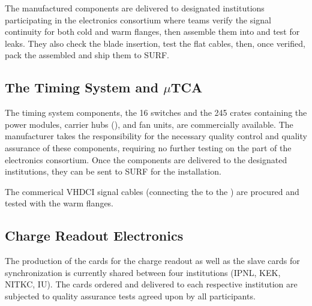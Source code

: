 The %
manufactured components are delivered to %
designated institutions participating in the \dual electronics consortium where teams verify the signal continuity %
for both cold and warm flanges, then assemble them into  and test for leaks. %
They also check the blade insertion, %
 test the flat cables,  %
 then, once verified, pack the assembled  %
 and ship them to SURF. 

\subsection{The Timing System and $\mu$TCA}
\label{sec:fddp-tpc-elec-prod-utca}

The timing system components, the  \num{16}  switches and the \num{245}  crates containing the power modules, carrier hubs (), and fan units,  %
are commercially available. The manufacturer takes the responsibility for the necessary quality control and quality assurance of these components, requiring no further testing on the part of the \dual electronics consortium. Once the components are delivered to the designated institutions, they can be sent to SURF for the installation. 

The commerical VHDCI signal cables (connecting the  to the ) are procured and tested with the  warm flanges.



\subsection{Charge Readout Electronics}
\label{sec:fddp-tpc-elec-prod-cro}
The production of the  cards for the charge readout as well as the  slave cards for synchronization is currently shared between four institutions (IPNL, KEK, NITKC, IU). The cards ordered and delivered to each respective institution are subjected to quality assurance tests agreed upon by all participants.  

